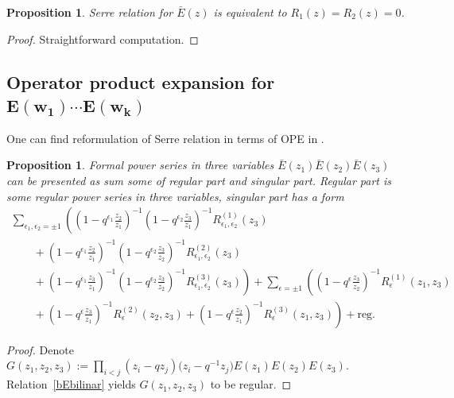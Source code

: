 \documentclass[pdftex]{sigma}
\numberwithin{equation}{section}
\newtheorem{Proposition}[Theorem]{Proposition}
\theoremstyle{definition}
\newcommand{\bE}{\bar{E}}
\begin{document}
\begin{Proposition} \label{prop:R1R2}
Serre relation for $\bE(z)$ is equivalent to $R_1(z)=R_2(z)=0$.
\end{Proposition}

\begin{proof}
Straightforward computation.
\end{proof}

\subsection[Operator product expansion for $E(w_1) \cdots E(w_k)$]{Operator product expansion for $\boldsymbol{E(w_1) \cdots E(w_k)}$}

One can find reformulation of Serre relation in terms of OPE in \cite[Section~3.3]{FJMM}.

\begin{Proposition}
Formal power series in three variables $\bE (z_1) \bE (z_2) \bE (z_3)$ can be presented as sum some of regular part and singular part. Regular part is some regular power series in three variables, singular part has a form
\begin{gather*}
\sum_{\epsilon_1, \epsilon_2 = \pm 1} \left( \left(1-q^{\epsilon_1}\frac{z_2}{z_1}\right)^{-1} \left(1-q^{\epsilon_2}\frac{z_3}{z_1}\right)^{-1} R^{(1)}_{\epsilon_1, \epsilon_2} (z_3)\right. \\
\qquad{}+\left(1-q^{\epsilon_1}\frac{z_2}{z_1}\right)^{-1} \left(1-q^{\epsilon_2}\frac{z_3}{z_2}\right)^{-1} R^{(2)}_{\epsilon_1, \epsilon_2} (z_3)\\
\left.\qquad{} +\left(1-q^{\epsilon_1}\frac{z_3}{z_1}\right)^{-1} \left(1-q^{\epsilon_2}\frac{z_3}{z_2}\right)^{-1} R^{(3)}_{\epsilon_1, \epsilon_2} (z_3) \right)+ \sum_{\epsilon = \pm 1} \left( \left(1-q^{\epsilon}\frac{z_3}{z_2}\right)^{-1} R^{(1)}_{\epsilon} (z_1, z_3) \right.\\
\left. \qquad {} +\left(1-q^{\epsilon}\frac{z_3}{z_1}\right)^{-1} R^{(2)}_{\epsilon} (z_2, z_3)+\left(1-q^{\epsilon}\frac{z_2}{z_1}\right)^{-1} R^{(3)}_{\epsilon} (z_1, z_3) \right) + \mathrm{reg}.
\end{gather*}
\end{Proposition}

\begin{proof}
Denote $G(z_1, z_2, z_3) := \prod\limits_{i<j} (z_i - q z_j)\big(z_i - q^{-1} z_j\big) E(z_1) E(z_2) E(z_3)$. Relation~\eqref{bEbilinar} yields $G(z_1, z_2, z_3)$ to be regular.
\end{proof}
\end{document}

